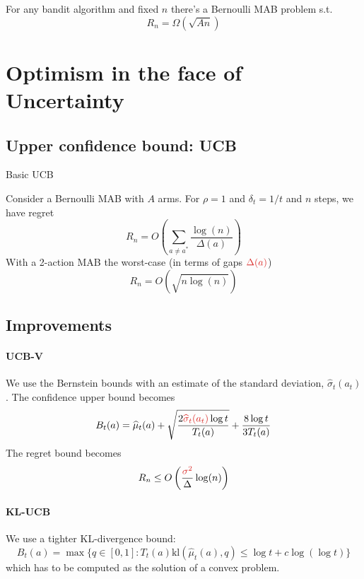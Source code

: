 \documentclass[../course-notes.tex]{subfiles}
\begin{document}
\begin{prop}
For any bandit algorithm and fixed $n$ there's a Bernoulli MAB problem s.t.
\[
	R_n = \Omega(\sqrt{An})
\]
\end{prop}


\section{Optimism in the face of Uncertainty}

\subsection{Upper confidence bound: UCB}

\begin{algorithm}\caption{Basic UCB}
\end{algorithm}

\begin{prop}
Consider a Bernoulli MAB with $A$ arms. For $\rho = 1$ and $\delta_t = 1/t$ and $n$ steps, we have regret
\[
	R_n = O\left(
	\sum_{a\neq a^*} \frac{\log(n)}{\Delta(a)}
	\right)
\]
With a 2-action MAB the worst-case (in terms of gaps $\redfont\Delta(a)$)
\[
	R_n = O(\sqrt{n\log(n)})
\]
\end{prop}


\subsection{Improvements}

\paragraph{UCB-V} We use the Bernstein bounds with an estimate of the standard deviation, $\widehat{\sigma}_t(a_t)$. The confidence upper bound becomes
\[
	B_t(a) = \widehat{\mu}_t(a)
	+ \sqrt{\frac{2{\redfont \widehat{\sigma}_t(a_t)}\log t}{T_t(a)}}
	+ \frac{8 \log t}{3 T_t(a)}
\]
The regret bound becomes
\[
	R_n \leq O\left( \frac{\redfont\sigma^2}{\Delta} \log(n) \right)
\]


\paragraph{KL-UCB} We use a tighter KL-divergence bound:
\[
	B_t(a) = \max\{
		q\in [0,1] :
		T_t(a)\mathrm{kl}(\widehat{\mu}_t(a), q) \leq \log t + c \log(\log t)
	\}
\]
which has to be computed as the solution of a convex problem.
\end{document}

